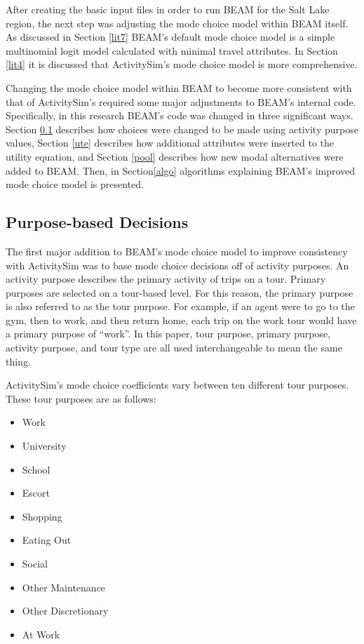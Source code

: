 \documentclass[12pt, oneside, openright]{byuthesis}
\providecommand{\tightlist}{%
  \setlength{\itemsep}{0pt}\setlength{\parskip}{0pt}}
\begin{document}
After creating the basic input files in order to run BEAM for the Salt Lake region, the next step was adjusting the mode choice model within BEAM itself. As discussed in Section \ref{lit7} BEAM's default mode choice model is a simple multinomial logit model calculated with minimal travel attributes. In Section \ref{lit4} it is discussed that ActivitySim's mode choice model is more comprehensive.

Changing the mode choice model within BEAM to become more consistent with that of ActivitySim's required some major adjustments to BEAM's internal code. Specifically, in this research BEAM's code was changed in three significant ways. Section \ref{purp} describes how choices were changed to be made using activity purpose values, Section \ref{ute} describes how additional attributes were inserted to the utility equation, and Section \ref{pool} describes how new modal alternatives were added to BEAM. Then, in Section\ref{algo} algorithms explaining BEAM's improved mode choice model is presented.

\hypertarget{purp}{%
\subsection{Purpose-based Decisions}\label{purp}}

The first major addition to BEAM's mode choice model to improve consistency with ActivitySim was to base mode choice decisions off of activity purposes. An activity purpose describes the primary activity of trips on a tour. Primary purposes are selected on a tour-based level. For this reason, the primary purpose is also referred to as the tour purpose. For example, if an agent were to go to the gym, then to work, and then return home, each trip on the work tour would have a primary purpose of ``work''. In this paper, tour purpose, primary purpose, activity purpose, and tour type are all used interchangeable to mean the same thing.

ActivitySim's mode choice coefficients vary between ten different tour purposes. These tour purposes are as follows:

\begin{itemize}
\tightlist
\item
  Work
\item
  University
\item
  School
\item
  Escort
\item
  Shopping
\item
  Eating Out
\item
  Social
\item
  Other Maintenance
\item
  Other Discretionary
\item
  At Work
\end{itemize}
\end{document}

